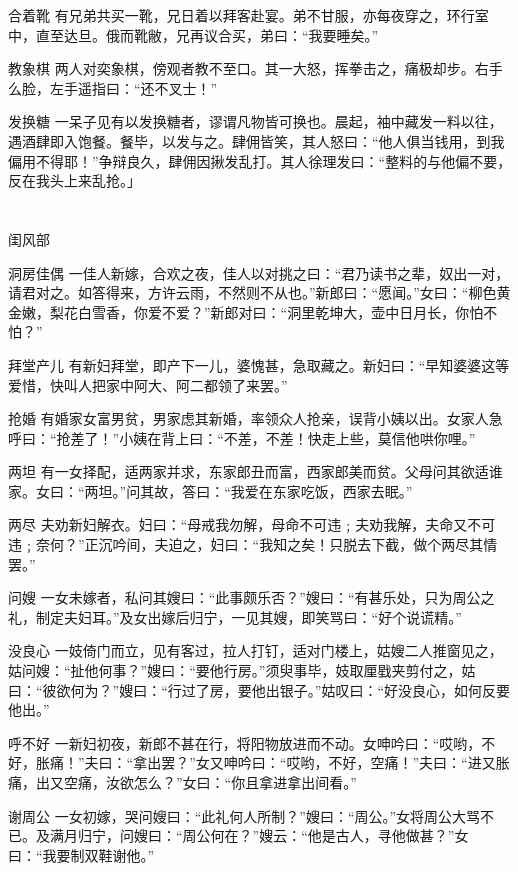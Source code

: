 \documentclass[12pt,UTF8]{ctexbook}
\begin{document}
合着靴
有兄弟共买一靴，兄日着以拜客赴宴。弟不甘服，亦每夜穿之，环行室中，直至达旦。俄而靴敝，兄再议合买，弟曰：“我要睡矣。”

教象棋
两人对奕象棋，傍观者教不至口。其一大怒，挥拳击之，痛极却步。右手么脸，左手遥指曰：“还不叉士！”

发换糖
一呆子见有以发换糖者，谬谓凡物皆可换也。晨起，袖中藏发一料以往，遇酒肆即入饱餐。餐毕，以发与之。肆佣皆笑，其人怒曰：“他人俱当钱用，到我偏用不得耶！”争辩良久，肆佣因揪发乱打。其人徐理发曰：“整料的与他偏不要，反在我头上来乱抢。」

\part{}

闺风部

洞房佳偶
一佳人新嫁，合欢之夜，佳人以对挑之曰：“君乃读书之辈，奴出一对，请君对之。如答得来，方许云雨，不然则不从也。”新郎曰：“愿闻。”女曰：“柳色黄金嫩，梨花白雪香，你爱不爱？”新郎对曰：“洞里乾坤大，壶中日月长，你怕不怕？”

拜堂产儿
有新妇拜堂，即产下一儿，婆愧甚，急取藏之。新妇曰：“早知婆婆这等爱惜，快叫人把家中阿大、阿二都领了来罢。”

抢婚
有婚家女富男贫，男家虑其新婚，率领众人抢亲，误背小姨以出。女家人急呼曰：“抢差了！”小姨在背上曰：“不差，不差！快走上些，莫信他哄你哩。”

两坦
有一女择配，适两家并求，东家郎丑而富，西家郎美而贫。父母问其欲适谁家。女曰：“两坦。”问其故，答曰：“我爱在东家吃饭，西家去眠。”

两尽
夫劝新妇解衣。妇曰：“母戒我勿解，母命不可违﹔夫劝我解，夫命又不可违﹔奈何？”正沉吟间，夫迫之，妇曰：“我知之矣！只脱去下截，做个两尽其情罢。”

问嫂
一女未嫁者，私问其嫂曰：“此事颇乐否？”嫂曰：“有甚乐处，只为周公之礼，制定夫妇耳。”及女出嫁后归宁，一见其嫂，即笑骂曰：“好个说谎精。”

没良心
一妓倚门而立，见有客过，拉人打钉，适对门楼上，姑嫂二人推窗见之，姑问嫂：“扯他何事？”嫂曰：“要他行房。”须臾事毕，妓取厘戥夹剪付之，姑曰：“彼欲何为？”嫂曰：“行过了房，要他出银子。”姑叹曰：“好没良心，如何反要他出。”

呼不好
一新妇初夜，新郎不甚在行，将阳物放进而不动。女呻吟曰：“哎哟，不好，胀痛！”夫曰：“拿出罢？”女又呻吟曰：“哎哟，不好，空痛！”夫曰：“进又胀痛，出又空痛，汝欲怎么？”女曰：“你且拿进拿出间看。”

谢周公
一女初嫁，哭问嫂曰：“此礼何人所制？”嫂曰：“周公。”女将周公大骂不已。及满月归宁，问嫂曰：“周公何在？”嫂云：“他是古人，寻他做甚？”女曰：“我要制双鞋谢他。”
\end{document}

